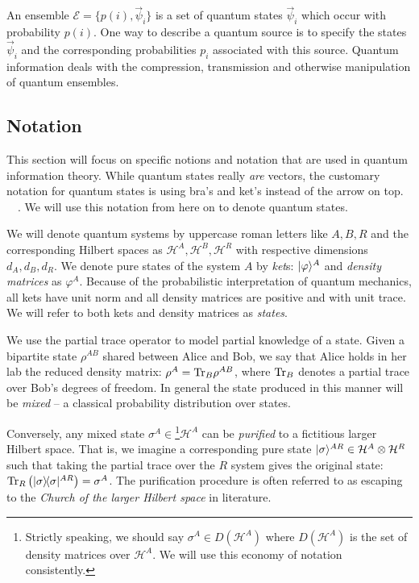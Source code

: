 \documentclass[aps,11pt,twoside,letterpaper]{article}
\def\Tr{\textup{Tr}}
\def\ph{\varphi}
\def\E{\mathcal{E}}
\def\cH{\mathcal{H}}
\begin{document}
	        An ensemble $\E=\{p(i), \vec{\psi}_i \}$ is a set of quantum states $\vec{\psi}_i$ which occur with 
	        probability $p(i)$. 
	        One way to describe a quantum source is to specify the states $\vec{\psi}_i$ and the
	        corresponding probabilities $p_i$ associated with this source. 
	        Quantum information deals with the compression, transmission and otherwise manipulation
	        of quantum ensembles. 
        
	\subsection{Notation}
		
		
		This section will focus on specific notions and notation that are used in quantum information theory.
		While quantum states really \emph{are} vectors, the customary notation for quantum states 
		is using bra's and ket's instead of the arrow on top.
		\be
				\ket{\psi} \ 	\triangleq \ \vec{\psi}.
		\ee
		We will use this notation from here on to denote quantum states.
		
		
		We will denote quantum systems by uppercase roman letters like $A,B,R$ and the corresponding 
		Hilbert spaces as $\cH^A, \cH^B, \cH^R$ with respective dimensions $d_A,d_B,d_R$.
	    We denote pure states of the system $A$ by \emph{ket}s: $\ket{\ph}^A$
	    and \emph{density matrices} as $\ph^A$.		%
		Because of the probabilistic interpretation of quantum mechanics, all kets have unit norm and all
		density matrices are positive and with unit trace.
	    We will refer to both kets and density matrices as \emph{states}.
	    
		We use the partial trace operator to model partial knowledge of a state.
		Given a bipartite state $\rho^{AB}$ shared between Alice and Bob, we say that Alice holds in her lab
		the reduced density matrix: $\rho^A = \Tr_B\rho^{AB}$, where $\Tr_B$ denotes a partial trace over 
		Bob's degrees of freedom.
		In general the state produced in this manner will be \emph{mixed} -- a classical probability distribution
		over states.
		
		Conversely, any mixed state $\sigma^A \in$\footnote{Strictly speaking, we should say 
		$\sigma^A \in D(\cH^A)$ where $D(\cH^A)$ is the set of density matrices over $\cH^A$. 
		We will use this economy of notation consistently.}$\cH^A$
		 can be \emph{purified} to a fictitious 
		larger Hilbert space. 
		That is, we imagine a corresponding pure state $\ket{\sigma}^{AR} \in \cH^A \otimes \cH^R$
		such that taking the partial trace over the $R$ system gives the original state: 
		$\Tr_R\left(\proj{\sigma}^{AR}\right)=\sigma^A$. 
		The purification procedure is often referred to as escaping to the \emph{Church of the larger
		Hilbert space} in literature.
\end{document}
